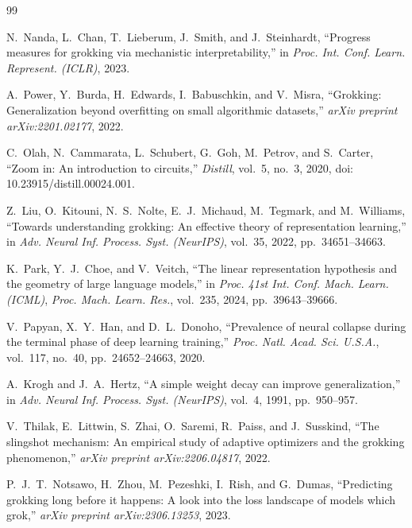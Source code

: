\documentclass[12pt,openany,a4paper]{book}
\begin{document}
{\renewcommand{\bibname}{References}%
\begin{thebibliography}{99}

N.~Nanda, L.~Chan, T.~Lieberum, J.~Smith, and J.~Steinhardt,
``Progress measures for grokking via mechanistic interpretability,''
in \textit{Proc. Int. Conf. Learn. Represent. (ICLR)}, 2023.

A.~Power, Y.~Burda, H.~Edwards, I.~Babuschkin, and V.~Misra,
``Grokking: Generalization beyond overfitting on small algorithmic
datasets,'' \textit{arXiv preprint arXiv:2201.02177}, 2022.

C.~Olah, N.~Cammarata, L.~Schubert, G.~Goh, M.~Petrov, and
S.~Carter,
``Zoom in: An introduction to circuits,''
\textit{Distill}, vol.~5, no.~3, 2020, doi: 10.23915/distill.00024.001.

Z.~Liu, O.~Kitouni, N.~S.~Nolte, E.~J.~Michaud, M.~Tegmark, and
M.~Williams, ``Towards understanding grokking: An effective theory
of representation learning,'' in \textit{Adv. Neural Inf. Process.
Syst. (NeurIPS)}, vol.~35, 2022, pp.~34651--34663.

K.~Park, Y.~J.~Choe, and V.~Veitch,
``The linear representation hypothesis and the geometry of
large language models,''
in \textit{Proc. 41st Int. Conf. Mach. Learn. (ICML)},
\textit{Proc. Mach. Learn. Res.}, vol.~235, 2024,
pp.~39643--39666.

V.~Papyan, X.~Y.~Han, and D.~L.~Donoho,
``Prevalence of neural collapse during the terminal phase of
deep learning training,''
\textit{Proc. Natl. Acad. Sci. U.S.A.}, vol.~117, no.~40,
pp.~24652--24663, 2020.

A.~Krogh and J.~A.~Hertz,
``A simple weight decay can improve generalization,''
in \textit{Adv. Neural Inf. Process. Syst. (NeurIPS)},
vol.~4, 1991, pp.~950--957.

V.~Thilak, E.~Littwin, S.~Zhai, O.~Saremi, R.~Paiss, and
J.~Susskind,
``The slingshot mechanism: An empirical study of adaptive
optimizers and the grokking phenomenon,''
\textit{arXiv preprint arXiv:2206.04817}, 2022.

P.~J.~T.~Notsawo, H.~Zhou, M.~Pezeshki, I.~Rish, and G.~Dumas,
``Predicting grokking long before it happens: A look into the
loss landscape of models which grok,''
\textit{arXiv preprint arXiv:2306.13253}, 2023.


\end{thebibliography}}
\end{document}
